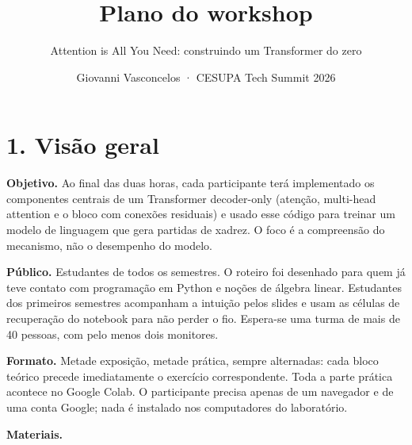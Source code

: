 \documentclass[
  11pt,
]{article}
\title{Plano do workshop}
\subtitle{Attention is All You Need: construindo um Transformer do zero}
\author{Giovanni Vasconcelos · CESUPA Tech Summit 2026}
\date{}
\begin{document}
\maketitle

\renewcommand*\contentsname{Sumário}
{
\hypersetup{linkcolor=}
\setcounter{tocdepth}{3}
\tableofcontents
}
\section{1. Visão geral}\label{visuxe3o-geral}

\textbf{Objetivo.} Ao final das duas horas, cada participante terá
implementado os componentes centrais de um Transformer decoder-only
(atenção, multi-head attention e o bloco com conexões residuais) e usado
esse código para treinar um modelo de linguagem que gera partidas de
xadrez. O foco é a compreensão do mecanismo, não o desempenho do modelo.

\textbf{Público.} Estudantes de todos os semestres. O roteiro foi
desenhado para quem já teve contato com programação em Python e noções
de álgebra linear. Estudantes dos primeiros semestres acompanham a
intuição pelos slides e usam as células de recuperação do notebook para
não perder o fio. Espera-se uma turma de mais de 40 pessoas, com pelo
menos dois monitores.

\textbf{Formato.} Metade exposição, metade prática, sempre alternadas:
cada bloco teórico precede imediatamente o exercício correspondente.
Toda a parte prática acontece no Google Colab. O participante precisa
apenas de um navegador e de uma conta Google; nada é instalado nos
computadores do laboratório.

\textbf{Materiais.}
\end{document}

